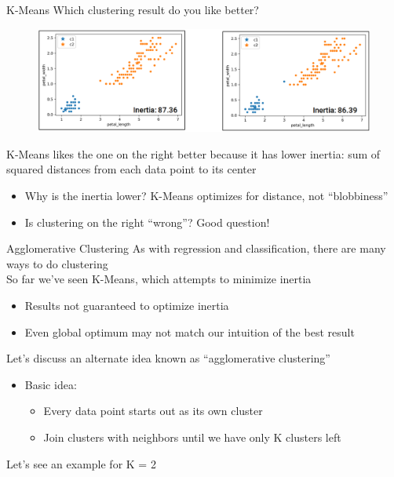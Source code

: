 \documentclass[aspectratio=169]{../latex_main/tntbeamer}  %
\begin{document}
	\begin{frame}{K-Means}
	    Which clustering result do you like better? 
	    \begin{figure}
	        \centering
	        \includegraphics[scale=.35]{Bild28}
	    \end{figure}
	    K-Means likes the one on the right better because it has lower inertia: sum of squared distances from each data point to its center
	    \begin{itemize}
	        \item Why is the inertia lower? K-Means optimizes for distance, not “blobbiness”
	        \item Is clustering on the right “wrong”? Good question! 
	    \end{itemize}
	\end{frame}
	
	
	\begin{frame}{Agglomerative Clustering}
	    As with regression and classification, there are many ways to do clustering\\
	    \bigskip
	    So far we’ve seen K-Means, which attempts to minimize inertia 
	    \begin{itemize}
	        \item Results not guaranteed to optimize inertia
	        \item Even global optimum may not match our intuition of the best result
	    \end{itemize}
	    \bigskip
	    Let’s discuss an alternate idea known as “agglomerative clustering”
	    \begin{itemize}
	        \item Basic idea: 
	        \begin{itemize}
	            \item Every data point starts out as its own cluster
	            \item Join clusters with neighbors until we have only K clusters left
	        \end{itemize}
	    \end{itemize}
	    Let’s see an example for K = 2
	\end{frame}
	
\end{document}
